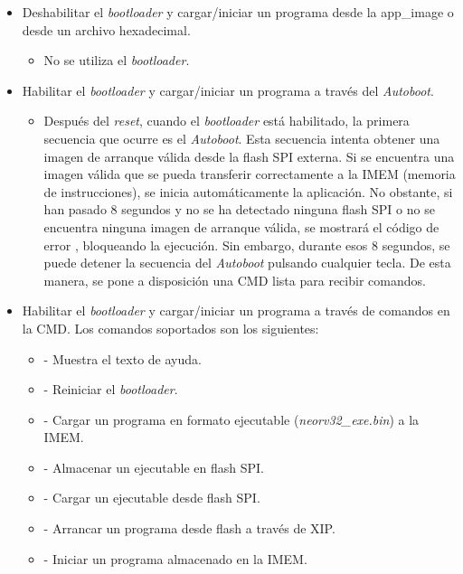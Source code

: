 \begin{itemize}
    \item Deshabilitar el \textit{bootloader} y cargar/iniciar un programa desde la app\_image o desde un archivo hexadecimal.
        \begin{itemize}
            \item No se utiliza el \textit{bootloader}.
        \end{itemize} 
    \item Habilitar el \textit{bootloader} y cargar/iniciar un programa a través del \textit{Autoboot}.
        \begin{itemize}
            \item Después del \textit{reset}, cuando el \textit{bootloader} está habilitado, la primera secuencia que ocurre es el \textit{Autoboot}. 
Esta secuencia intenta obtener una imagen de arranque válida desde la flash SPI externa.
Si se encuentra una imagen válida que se pueda transferir correctamente a la IMEM (memoria de instrucciones), se inicia automáticamente la aplicación.
No obstante, si han pasado 8 segundos y no se ha detectado ninguna flash SPI o no se encuentra ninguna imagen de arranque válida, se mostrará el código de error , bloqueando la ejecución.
Sin embargo, durante esos 8 segundos, se puede detener la secuencia del \textit{Autoboot} pulsando cualquier tecla. 
De esta manera, se pone a disposición una CMD lista para recibir comandos.
        \end{itemize} 
    \item Habilitar el \textit{bootloader} y cargar/iniciar un programa a través de comandos en la CMD.
Los comandos soportados son los siguientes:
        \begin{itemize}
            \item {} - Muestra el texto de ayuda.
            \item {} - Reiniciar el \textit{bootloader}.
            \item {} - Cargar un programa en formato ejecutable (\textit{neorv32\_exe.bin}) a la IMEM.
            \item {} - Almacenar un ejecutable en flash SPI.
            \item {} - Cargar un ejecutable desde flash SPI.
            \item {} - Arrancar un programa desde flash a través de XIP.
            \item {} - Iniciar un programa almacenado en la IMEM.
        \end{itemize} 
\end{itemize} 


